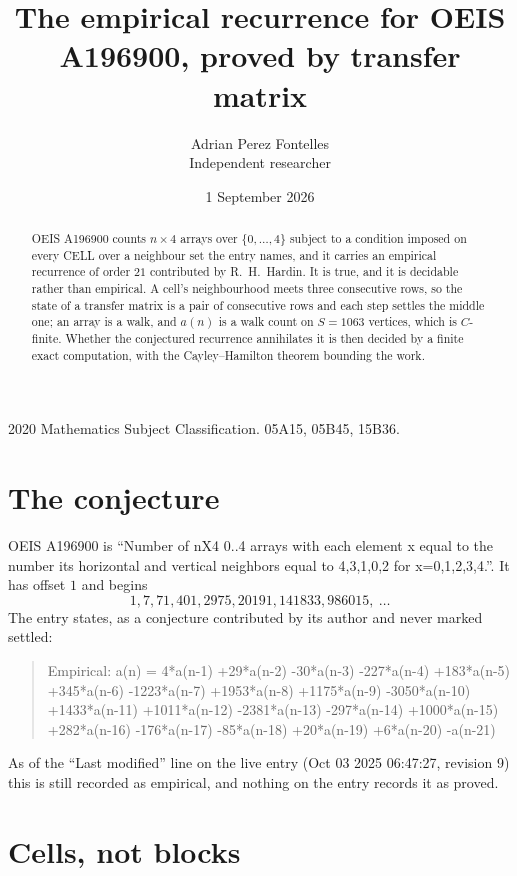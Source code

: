 \documentclass[11pt,a4paper]{article}
\title{The empirical recurrence for OEIS A196900, proved by transfer matrix}
\author{Adrian Perez Fontelles\\ \small Independent researcher}
\date{1 September 2026}
\theoremstyle{plain}
\theoremstyle{definition}
\begin{document}
\maketitle

\begin{abstract}
OEIS A196900 counts $n\times4$ arrays over $\{0,\dots,4\}$ subject to a condition imposed on
every CELL over a neighbour set the entry names, and it carries an empirical recurrence of
order $21$ contributed by R.~H.~Hardin. It is true, and it is decidable rather than
empirical. A cell's neighbourhood meets three consecutive rows, so the state of a transfer
matrix is a pair of consecutive rows and each step settles the middle one; an array is a
walk, and $a(n)$ is a walk count on $S=1063$ vertices, which is $C$-finite. Whether the
conjectured recurrence annihilates it is then decided by a finite exact computation, with the
Cayley--Hamilton theorem bounding the work.
\end{abstract}

\noindent\small 2020 Mathematics Subject Classification. 05A15, 05B45, 15B36.\normalsize

\section{The conjecture}

OEIS A196900 is ``Number of nX4 0..4 arrays with each element x equal to the number its horizontal and vertical neighbors equal to 4,3,1,0,2 for x=0,1,2,3,4.''. It has offset $1$ and begins
\[
1, 7, 71, 401, 2975, 20191, 141833, 986015,\ \dots
\]
The entry states, as a conjecture contributed by its author and never marked settled:
\begin{quote}
Empirical: a(n) = 4*a(n-1) +29*a(n-2) -30*a(n-3) -227*a(n-4) +183*a(n-5) +345*a(n-6) -1223*a(n-7) +1953*a(n-8) +1175*a(n-9) -3050*a(n-10) +1433*a(n-11) +1011*a(n-12) -2381*a(n-13) -297*a(n-14) +1000*a(n-15) +282*a(n-16) -176*a(n-17) -85*a(n-18) +20*a(n-19) +6*a(n-20) -a(n-21)
\end{quote}
As of the ``Last modified'' line on the live entry (Oct 03 2025 06:47:27, revision 9) this is still
recorded as empirical, and nothing on the entry records it as proved.

\section{Cells, not blocks}
\end{document}
